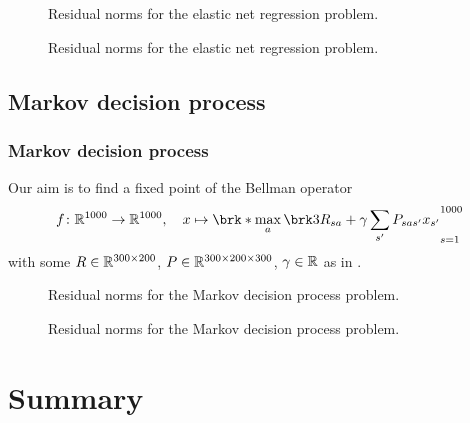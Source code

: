 \begin{frame}
	\begin{figure}
		\centering
		{\scriptsize
		
		}
		\caption{Residual norms for the elastic net regression problem.}
	\end{figure}
\end{frame}

\begin{frame}
	\begin{figure}
		\centering
		{\scriptsize
		
		}
		\caption{Residual norms for the elastic net regression problem.}
	\end{figure}
\end{frame}
\subsection{Markov decision process}

\begin{frame}
	\frametitle{Markov decision process}
	Our aim is to find a fixed point of the Bellman operator
	\begin{align*}
		f\colon\R^{1000}\to\R^{1000}, \quad x\mapsto \brk*{\max_{a} \brk3{ R_{sa}+\gamma \sum_{s'}P_{sas'}x_{s'}}}_{s=1}^{1000}
	\end{align*}
	with some $R\in\mathbb{R}^{300\times 200}$, $P\in\mathbb{R}^{300\times 200\times 300}$, $\gamma\in\mathbb{R}$ as in \cite{ZhaAA}.
\end{frame}


\begin{frame}
	\begin{figure}
		\centering
		{\scriptsize
		
		}
		\caption{Residual norms for the Markov decision process problem.}
	\end{figure}
\end{frame}

\begin{frame}
	\begin{figure}
		\centering
		{\scriptsize
		
		}
		\caption{Residual norms for the Markov decision process problem.}
	\end{figure}
\end{frame}

\section{Summary}

